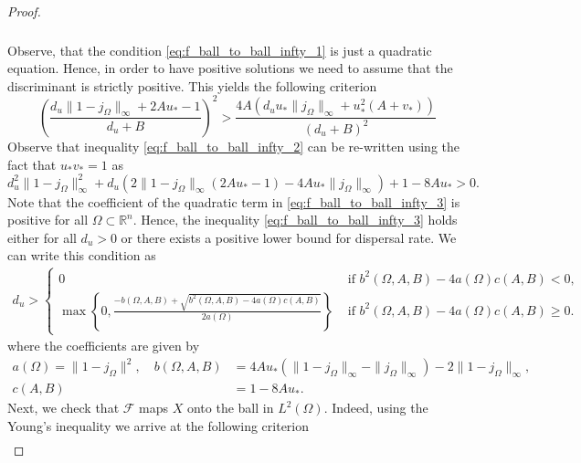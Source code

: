 \documentclass[12pt, a4paper]{article}
\theoremstyle{break}
\theoremstyle{break}
\theoremstyle{break}
\theoremstyle{break}
\theoremstyle{break}
\theoremstyle{break}
\theoremstyle{break}
\begin{document}
\begin{proof}
\begin{align}
\begin{split}
        \end{split}
    \end{align}
    Observe, that the condition \eqref{eq:f_ball_to_ball_infty_1} is just a quadratic equation. Hence, in order to have positive solutions we need to assume that the discriminant is strictly positive. This yields the following criterion
    \begin{equation}
        \label{eq:f_ball_to_ball_infty_2}
        \left( \frac{d_u \|1-j_\Omega\|_\infty  + 2 A u_* - 1}{d_u + B}\right)^2
        >
        \frac{4A \left( d_u u_* \|j_\Omega\|_\infty + u_*^2(A + v_* )\right)}{(d_u + B)^2}
    \end{equation}
    Observe that inequality \eqref{eq:f_ball_to_ball_infty_2} can be re-written using the fact that $u_*v_* = 1$ as
    \begin{equation}
        \label{eq:f_ball_to_ball_infty_3}
        d_u^2\|1-j_\Omega\|_\infty^2 +
        d_u\left( 2\|1-j_\Omega\|_\infty(2Au_* - 1) - 4A u_*\|j_\Omega\|_\infty\right)  +
        1 - 8Au_*
        >
        0.
    \end{equation}
    Note that the coefficient of the quadratic term in \eqref{eq:f_ball_to_ball_infty_3} is positive for all $\Omega \subset \mathbb{R}^n$. Hence, the inequality \eqref{eq:f_ball_to_ball_infty_3} holds either for all $d_u > 0$ or there exists a positive lower bound for dispersal rate. We can write this condition as
    \begin{align}
        d_u > 
        \begin{cases}
            0 &\text{ if } b^2(\Omega, A, B) - 4 a(\Omega)c(A, B) < 0, \\
            \max\left\{0, \frac{-b(\Omega, A, B) + \sqrt{b^2(\Omega, A, B) - 4 a(\Omega)c(A, B)}}{2 a(\Omega)}\right\} &\text{ if } b^2(\Omega, A, B) - 4 a(\Omega)c(A, B) \geq 0.
        \end{cases}
    \end{align}
    where the coefficients are given by
    \begin{align*}
        a(\Omega) = \|1-j_\Omega\|^2, \quad
        b(\Omega, A, B) &= 4Au_*(\|1-j_\Omega\|_\infty - \|j_\Omega\|_\infty)- 2\|1-j_\Omega\|_\infty, \\
        c(A, B) &= 1 - 8Au_*.
    \end{align*}
    Next, we check that $\mathcal{F}$ maps $X$ onto the ball in $L^2(\Omega)$. Indeed, using the Young's inequality we arrive at the following criterion
    \begin{align}
        \label{eq:f_ball_to_ball_l2_1}

\end{align}
\end{proof}
\end{document}
